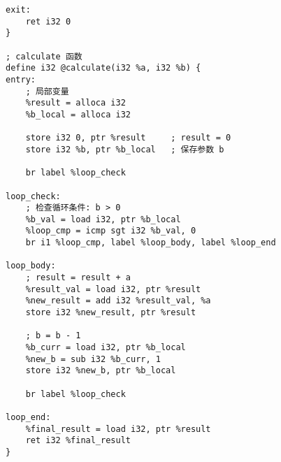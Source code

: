 \documentclass[a4paper]{article}
\begin{document}
\begin{lstlisting}[language=text,caption={test\_new.ll}]
exit:
    ret i32 0
}

; calculate 函数
define i32 @calculate(i32 %a, i32 %b) {
entry:
    ; 局部变量
    %result = alloca i32
    %b_local = alloca i32
    
    store i32 0, ptr %result     ; result = 0
    store i32 %b, ptr %b_local   ; 保存参数 b
    
    br label %loop_check

loop_check:
    ; 检查循环条件: b > 0
    %b_val = load i32, ptr %b_local
    %loop_cmp = icmp sgt i32 %b_val, 0
    br i1 %loop_cmp, label %loop_body, label %loop_end

loop_body:
    ; result = result + a
    %result_val = load i32, ptr %result
    %new_result = add i32 %result_val, %a
    store i32 %new_result, ptr %result
    
    ; b = b - 1
    %b_curr = load i32, ptr %b_local
    %new_b = sub i32 %b_curr, 1
    store i32 %new_b, ptr %b_local
    
    br label %loop_check

loop_end:
    %final_result = load i32, ptr %result
    ret i32 %final_result
}

\end{lstlisting}

% 
%  
\end{document}
